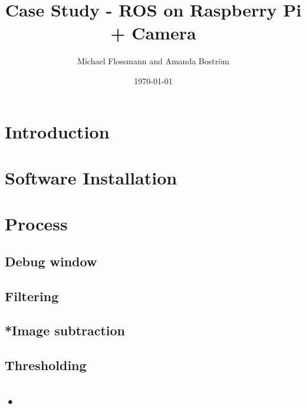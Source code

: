 \documentclass[10pt,a4paper, singlespace]{article}
\author{Michael Flossmann and Amanda Boström}
\title{Case Study - ROS on Raspberry Pi + Camera}
\date{\today}
\begin{document}
\maketitle

\section*{Introduction}

\section*{Software Installation}

\section*{Process}
\subsection*{Debug window}
\subsection*{Filtering}
\subsection*{*Image subtraction}
\subsection*{Thresholding}
\subsection*{•}
\end{document}
